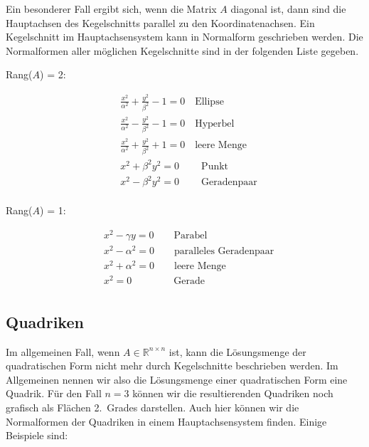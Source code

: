 \vspace{\baselineskip}

Ein besonderer Fall ergibt sich, wenn die Matrix \( A \) diagonal ist, dann sind die Hauptachsen des Kegelschnitts parallel zu den Koordinatenachsen. Ein Kegelschnitt im Hauptachsensystem kann in Normalform geschrieben werden. Die Normalformen aller möglichen Kegelschnitte sind in der folgenden Liste gegeben.

\vspace{\baselineskip}

Rang(\( A \)) = 2:

\begin{equation*}
    \begin{aligned}
        & \frac{x^2}{\alpha^2} + \frac{y^2}{\beta^2} - 1 = 0  \quad \text{Ellipse} \\
        & \frac{x^2}{\alpha^2} - \frac{y^2}{\beta^2} - 1 = 0  \quad \text{Hyperbel} \\
        & \frac{x^2}{\alpha^2} + \frac{y^2}{\beta^2} + 1 = 0  \quad \text{leere Menge} \\
        & x^2 + \beta^2 y^2 = 0 \qquad \ \text{Punkt} \\[0.5em]
        & x^2 - \beta^2 y^2 = 0 \qquad \ \text{Geradenpaar} \\
    \end{aligned}
\end{equation*}
        
Rang(\( A \)) = 1:

\begin{equation*}
    \begin{aligned}
        & x^2 - \gamma y = 0 \qquad \text{Parabel} \\
        & x^2 - \alpha^2 = 0 \qquad \text{paralleles Geradenpaar} \\
        & x^2 + \alpha^2 = 0 \qquad \text{leere Menge} \\
        & x^2 = 0 \qquad \qquad \ \text{Gerade} \\
    \end{aligned}
\end{equation*}

\subsection{Quadriken}

Im allgemeinen Fall, wenn \( A \in \mathbb{R}^{n \times n} \) ist, kann die Lösungsmenge der quadratischen Form nicht mehr durch Kegelschnitte beschrieben werden. Im Allgemeinen nennen wir also die Lösungsmenge einer quadratischen Form eine Quadrik. Für den Fall \( n = 3 \) können wir die resultierenden Quadriken noch grafisch als Flächen 2.\ Grades darstellen. Auch hier können wir die Normalformen der Quadriken in einem Hauptachsensystem finden. Einige Beispiele sind:

